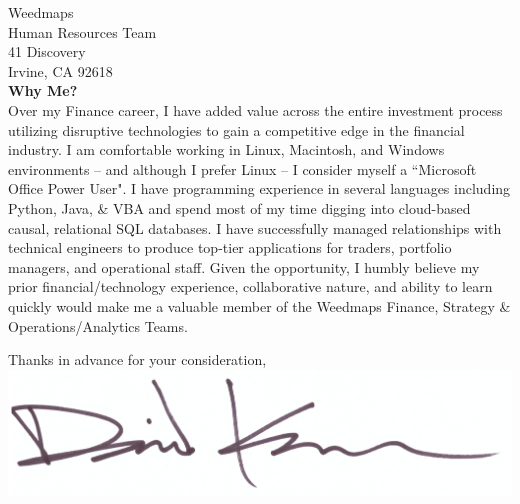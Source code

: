 \documentclass{letter}
\begin{document}
\begin{letter}{
  Weedmaps \\
  Human Resources Team \\
  41 Discovery \\
  Irvine, CA 92618 \\
}
\textbf{Why Me?} \\
Over my Finance career, I have added value across the entire investment process
utilizing disruptive technologies to gain a competitive edge in the
financial industry. I am comfortable working in Linux, Macintosh, and Windows
environments -- and although I prefer Linux -- I consider myself a
``Microsoft Office Power User". I have programming
experience in several languages including Python, Java, \& VBA and spend most of 
my time digging into cloud-based causal, relational SQL databases. I have successfully
managed relationships with technical engineers to produce top-tier applications
for traders, portfolio managers, and operational staff. Given the opportunity, I
humbly believe my prior financial/technology experience, collaborative nature,
and ability to learn quickly would make me a valuable member of the Weedmaps
Finance, Strategy \& Operations/Analytics Teams. \\


\vspace{-0.2in}
 
\closing{
  Thanks in advance for your consideration, \\
  \vspace{.15in}
  \includegraphics[scale=0.25]{signature.png}
}

\end{letter}
\end{document}
